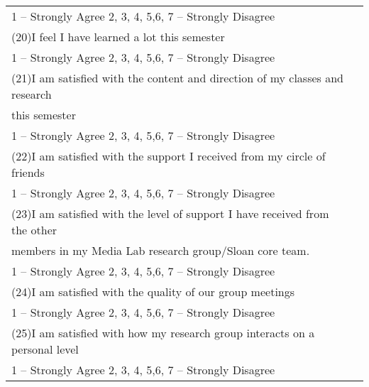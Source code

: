 \begin{longtable}[l]{l*{1}{l}}
1 – Strongly Agree 2, 3, 4, 5,6, 7 – Strongly Disagree \\
(20)I feel I have learned a lot this semester \\
1 – Strongly Agree 2, 3, 4, 5,6, 7 – Strongly Disagree \\
(21)I am satisfied with the content and direction of my classes and research \\
this semester \\
1 – Strongly Agree 2, 3, 4, 5,6, 7 – Strongly Disagree \\
(22)I am satisfied with the support I received from my circle of friends \\
1 – Strongly Agree 2, 3, 4, 5,6, 7 – Strongly Disagree \\
(23)I am satisfied with the level of support I have received from the other \\
members in my Media Lab research group/Sloan core team. \\
1 – Strongly Agree 2, 3, 4, 5,6, 7 – Strongly Disagree \\
(24)I am satisfied with the quality of our group meetings \\
1 – Strongly Agree 2, 3, 4, 5,6, 7 – Strongly Disagree \\
(25)I am satisfied with how my research group interacts on a personal level \\
1 – Strongly Agree 2, 3, 4, 5,6, 7 – Strongly Disagree \\
\bottomrule[1.5pt]
\end{longtable}

